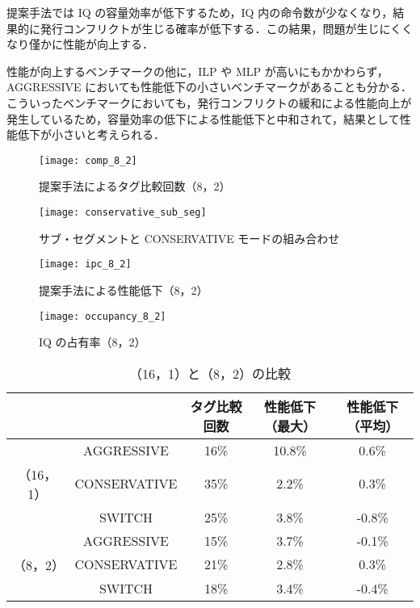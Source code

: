 提案手法では IQ の容量効率が低下するため，IQ 内の命令数が少なくなり，結果的に発行コンフリクトが生じる確率が低下する．この結果，問題が生じにくくなり僅かに性能が向上する．

性能が向上するベンチマークの他に，ILP や MLP が高いにもかかわらず，AGGRESSIVE においても性能低下の小さいベンチマークがあることも分かる．こういったベンチマークにおいても，発行コンフリクトの緩和による性能向上が発生しているため，容量効率の低下による性能低下と中和されて，結果として性能低下が小さいと考えられる．

\begin{figure}[htb]
  \centering
  \texttt{[image: comp\_8\_2]}
  \caption{提案手法によるタグ比較回数（8，2）}
  \label{fig:comp_8_2}
\end{figure}

\begin{figure}[htb]
  \centering
  \texttt{[image: conservative\_sub\_seg]}
  \caption{サブ・セグメントと CONSERVATIVE モードの組み合わせ}
  \label{fig:conservative_sub_seg}
\end{figure}

\begin{figure}[htb]
  \centering
  \texttt{[image: ipc\_8\_2]}
  \caption{提案手法による性能低下（8，2）}
  \label{fig:ipc_8_2}
\end{figure}
\begin{figure}[htb]
  \centering
  \texttt{[image: occupancy\_8\_2]}
  \caption{IQ の占有率（8，2）}
  \label{fig:occupancy_8_2}
\end{figure}

\begin{table}[htb]
  \caption{（16，1）と（8，2）の比較}
  \footnotesize
  \center
    \begin{tabular}{cc|c|c|c} \hline \hline
     & & タグ比較回数 & 性能低下（最大） & 性能低下（平均）\\\hline
     & AGGRESSIVE  & 16\%  & 10.8\% & 0.6\% \\
    （16，1） & CONSERVATIVE & 35\% & 2.2\% & 0.3\% \\ \
     & SWITCH & 25\% & 3.8\% & -0.8\% \\ \hline
     & AGGRESSIVE & 15\% & 3.7\% & -0.1\% \\
    （8，2） & CONSERVATIVE & 21\% & 2.8\% & 0.3\% \\ 
     & SWITCH & 18\% & 3.4\% & -0.4\% \\ \hline
  \end{tabular}
  \label{tab:subseg_eval}
\end{table}

